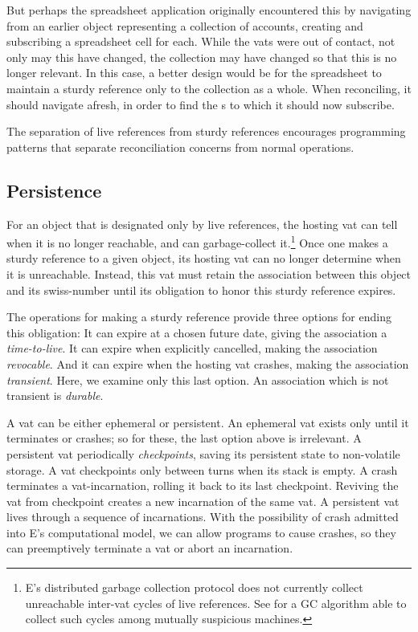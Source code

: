 \documentclass{llncs}
\begin{document}
But perhaps the spreadsheet application originally encountered this
 by navigating from an earlier object representing
a collection of accounts, creating and subscribing a spreadsheet cell
for each. While the vats were out of contact, not only may this
 have changed, the collection may have changed so
that this  is no longer relevant. In this case, a
better design would be for the spreadsheet to maintain a sturdy
reference only to the collection as a whole. When reconciling, it
should navigate afresh, in order to find the s to
which it should now subscribe.

The separation of live references from sturdy references encourages
programming patterns that separate reconciliation concerns from normal
operations.

\subsection{Persistence}

For an object that is designated only by live references, the hosting
vat can tell when it is no longer reachable, and can garbage-collect
it.\footnote{
%
E's distributed garbage collection protocol does not currently collect
unreachable inter-vat cycles of live references. See \cite{bejar:gc}
for a GC algorithm able to collect such cycles among mutually
suspicious machines.}
%
Once one makes a sturdy reference to a given object, its hosting vat
can no longer determine when it is unreachable. Instead, this vat must
retain the association between this object and its swiss-number until
its obligation to honor this sturdy reference expires.

The operations for making a sturdy reference provide three options for
ending this obligation: It can expire at a chosen future date, giving
the association a \emph{time-to-live}. It can expire when explicitly
cancelled, making the association \emph{revocable}. And it can expire
when the hosting vat crashes, making the association
\emph{transient}. Here, we examine only this last option. An
association which is not transient is \emph{durable}.

A vat can be either ephemeral or persistent. An ephemeral vat exists
only until it terminates or crashes; so for these, the last option
above is irrelevant. A persistent vat periodically \emph{checkpoints},
saving its persistent state to non-volatile storage. A vat checkpoints
only between turns when its stack is empty. A crash terminates a
vat-incarnation, rolling it back to its last checkpoint. Reviving the
vat from checkpoint creates a new incarnation of the same vat. A
persistent vat lives through a sequence of incarnations. With the
possibility of crash admitted into E's computational model, we can
allow programs to cause crashes, so they can preemptively terminate a
vat or abort an incarnation.
\end{document}
